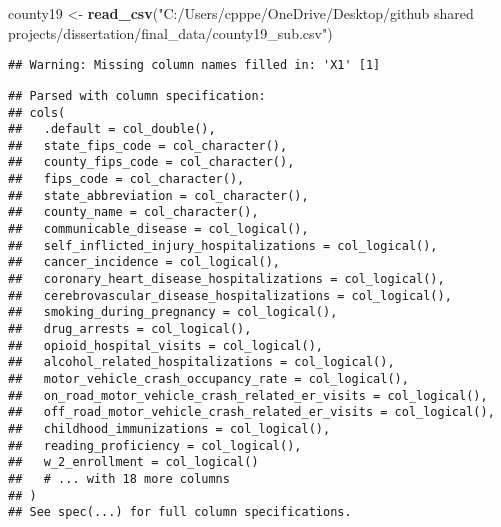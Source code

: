 \documentclass[
]{article}
\newenvironment{Shaded}{\begin{snugshade}}{\end{snugshade}}
\newcommand{\KeywordTok}[1]{\textcolor[rgb]{0.13,0.29,0.53}{\textbf{#1}}}
\newcommand{\NormalTok}[1]{#1}
\newcommand{\StringTok}[1]{\textcolor[rgb]{0.31,0.60,0.02}{#1}}
\begin{document}
\begin{Shaded}
\begin{Highlighting}[]
\NormalTok{county19 <-}\StringTok{ }\KeywordTok{read_csv}\NormalTok{(}\StringTok{"C:/Users/cpppe/OneDrive/Desktop/github shared projects/dissertation/final_data/county19_sub.csv"}\NormalTok{)}
\end{Highlighting}
\end{Shaded}

\begin{verbatim}
## Warning: Missing column names filled in: 'X1' [1]
\end{verbatim}

\begin{verbatim}
## Parsed with column specification:
## cols(
##   .default = col_double(),
##   state_fips_code = col_character(),
##   county_fips_code = col_character(),
##   fips_code = col_character(),
##   state_abbreviation = col_character(),
##   county_name = col_character(),
##   communicable_disease = col_logical(),
##   self_inflicted_injury_hospitalizations = col_logical(),
##   cancer_incidence = col_logical(),
##   coronary_heart_disease_hospitalizations = col_logical(),
##   cerebrovascular_disease_hospitalizations = col_logical(),
##   smoking_during_pregnancy = col_logical(),
##   drug_arrests = col_logical(),
##   opioid_hospital_visits = col_logical(),
##   alcohol_related_hospitalizations = col_logical(),
##   motor_vehicle_crash_occupancy_rate = col_logical(),
##   on_road_motor_vehicle_crash_related_er_visits = col_logical(),
##   off_road_motor_vehicle_crash_related_er_visits = col_logical(),
##   childhood_immunizations = col_logical(),
##   reading_proficiency = col_logical(),
##   w_2_enrollment = col_logical()
##   # ... with 18 more columns
## )
## See spec(...) for full column specifications.
\end{verbatim}
\end{document}
